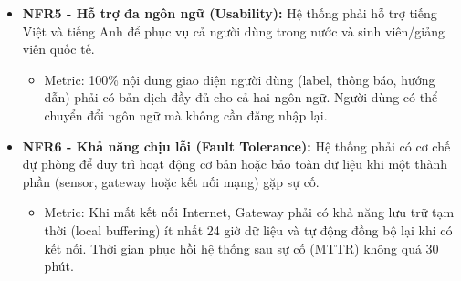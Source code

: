 \begin{itemize}
    \item \textbf{NFR5 - Hỗ trợ đa ngôn ngữ (Usability):} Hệ thống phải hỗ trợ tiếng Việt và tiếng Anh để phục vụ cả người dùng trong nước và sinh viên/giảng viên quốc tế. %
    \vspace*{-5pt}
    \begin{itemize}
        \item Metric: 100\% nội dung giao diện người dùng (label, thông báo, hướng dẫn) phải có bản dịch đầy đủ cho cả hai ngôn ngữ. %
        Người dùng có thể chuyển đổi ngôn ngữ mà không cần đăng nhập lại. %
    \end{itemize}



    \item \textbf{NFR6 - Khả năng chịu lỗi (Fault Tolerance):} Hệ thống phải có cơ chế dự phòng để duy trì hoạt động cơ bản hoặc bảo toàn dữ liệu khi một thành phần (sensor, gateway hoặc kết nối mạng) gặp sự cố.
    \vspace*{-5pt}
    \begin{itemize}
        \item Metric: Khi mất kết nối Internet, Gateway phải có khả năng lưu trữ tạm thời (local buffering) ít nhất 24 giờ dữ liệu và tự động đồng bộ lại khi có kết nối. Thời gian phục hồi hệ thống sau sự cố (MTTR) không quá 30 phút.
    \end{itemize}
\end{itemize}